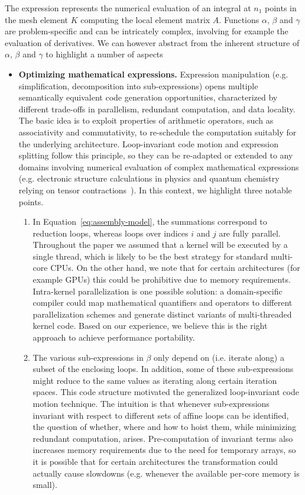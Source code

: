 The expression represents the numerical evaluation of an integral at $n_1$ points in the mesh element $K$ computing the local element matrix $A$. Functions $\alpha$, $\beta$ and $\gamma$ are problem-specific and can be intricately complex, involving for example the evaluation of derivatives. We can however abstract from the inherent structure of $\alpha$, $\beta$ and $\gamma$ to highlight a number of aspects

\begin{itemize}
\item \textbf{Optimizing mathematical expressions.} Expression manipulation (e.g. simplification, decomposition into sub-expressions) opens multiple semantically equivalent code generation opportunities, characterized by different trade-offs in parallelism, redundant computation, and data locality. The basic idea is to exploit properties of arithmetic operators, such as associativity and commutativity, to re-schedule the computation suitably for the underlying architecture. Loop-invariant code motion and expression splitting follow this principle, so they can be re-adapted or extended to any domains involving numerical evaluation of complex mathematical expressions (e.g. electronic structure calculations in physics and quantum chemistry relying on tensor contractions~\cite{TCE}). In this context, we highlight three notable points.
\begin{enumerate}
\item In Equation~\eqref{eq:assembly-model}, the summations correspond to reduction loops, whereas loops over indices $i$ and $j$ are fully parallel. Throughout the paper we assumed that a kernel will be executed by a single thread, which is likely to be the best strategy for standard multi-core CPUs. On the other hand, we note that for certain architectures (for example GPUs) this could be prohibitive due to memory requirements. Intra-kernel parallelization is one possible solution: a domain-specific compiler could map mathematical quantifiers and operators to different parallelization schemes and generate distinct variants of multi-threaded kernel code. Based on our experience, we believe this is the right approach to achieve performance portability.
\item The various sub-expressions in $\beta$ only depend on (i.e. iterate along) a subset of the enclosing loops. In addition, some of these sub-expressions might reduce to the same values as iterating along certain iteration spaces. This code structure motivated the generalized loop-invariant code motion technique. The intuition is that whenever sub-expressions invariant with respect to different sets of affine loops can be identified, the question of whether, where and how to hoist them, while minimizing redundant computation, arises. Pre-computation of invariant terms also increases memory requirements due to the need for temporary arrays, so it is possible that for certain architectures the transformation could actually cause slowdowns (e.g. whenever the available per-core memory is small).

\end{enumerate}
\end{itemize}
